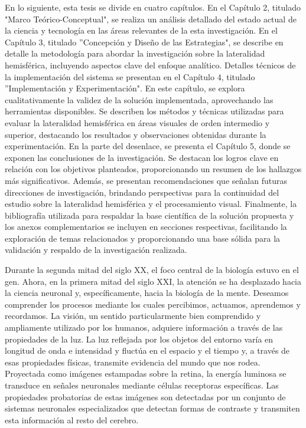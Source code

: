\documentclass{article}
\begin{document}
En lo siguiente, esta tesis se divide en cuatro capítulos.  En el Capítulo 2, titulado "Marco Teórico-Conceptual", se realiza un análisis detallado del estado actual de la ciencia y tecnología en las áreas relevantes de la esta investigaci\'on. En el Capítulo 3, titulado ''Concepción y Diseño de las Estrategias", se describe en detalle la metodología para abordar la investigación sobre la lateralidad hemisférica, incluyendo aspectos clave del enfoque analítico. Detalles técnicos de la implementación del sistema se presentan en el Capítulo 4, titulado ''Implementación y Experimentación". En este capítulo, se explora cualitativamente la validez de la solución implementada, aprovechando las herramientas disponibles. Se describen los métodos y técnicas utilizadas para evaluar la lateralidad hemisférica en áreas visuales de orden intermedio y superior, destacando los resultados y observaciones obtenidas durante la experimentación. En la parte del desenlace, se presenta el Capítulo 5, donde se exponen las conclusiones de la investigación. Se destacan los logros clave en relación con los objetivos planteados, proporcionando un resumen de los hallazgos más significativos. Además, se presentan recomendaciones que señalan futuras direcciones de investigación, brindando perspectivas para la continuidad del estudio sobre la lateralidad hemisférica y el procesamiento visual. Finalmente, la bibliografía utilizada para respaldar la base científica de la solución propuesta y los anexos complementarios se incluyen en secciones respectivas, facilitando la exploración de temas relacionados y proporcionando una base sólida para la validación y respaldo de la investigación realizada.
	
	\newpage
	
	
	
	\newpage
	
	Durante la segunda mitad del siglo XX, el foco central de la biología estuvo en el gen. Ahora, en la primera mitad del siglo XXI, la atención se ha desplazado hacia la ciencia neuronal y, específicamente, hacia la biología de la mente. Deseamos comprender los procesos mediante los cuales percibimos, actuamos, aprendemos y recordamos.
	La visión, un sentido particularmente bien comprendido y ampliamente utilizado por los humanos, adquiere información a través de las propiedades de la luz. La luz reflejada por los objetos del entorno varía en longitud de onda e intensidad y fluctúa en el espacio y el tiempo y, a través de esas propiedades físicas, transmite evidencia del mundo que nos rodea. Proyectada como imágenes estampadas sobre la retina, la energía luminosa se transduce en señales neuronales mediante células receptoras específicas. Las propiedades probatorias de estas imágenes son detectadas por un conjunto de sistemas neuronales especializados que detectan formas de contraste y transmiten esta información al resto del cerebro.
	
\end{document}
